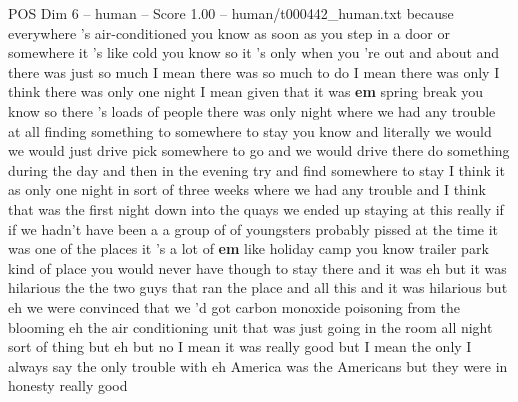\begin{textsample}{POS Dim 6 – human – Score 1.00 – human/t000442\_human.txt}  \label{ex:f6_pos_017}
because everywhere 's air-conditioned you know as soon as you step in a door or somewhere it 's like cold you know so it 's only when you 're out and about and there was just so much I mean there was so much to do I mean there was only I think there was only one night I mean given that it was \textbf{em} spring break you know so there 's loads of people there was only night where we had any trouble at all finding something to somewhere to stay you know and literally we would we would just drive pick somewhere to go and we would drive there do something during the day and then in the evening try and find somewhere to stay I think it as only one night in sort of three weeks where we had any trouble and I think that was the first night down into the quays we ended up staying at this really if if we hadn't have been a a group of of youngsters probably pissed at the time it was one of the places it 's a lot of \textbf{em} like holiday camp you know trailer park kind of place you would never have though to stay there and it was eh but it was hilarious the the two guys that ran the place and all this and it was hilarious but eh we were convinced that we 'd got carbon monoxide poisoning from the blooming eh the air conditioning unit that was just going in the room all night sort of thing but eh but no I mean it was really good but I mean the only I always say the only trouble with eh America was the Americans but they were in honesty really good

\end{textsample}
